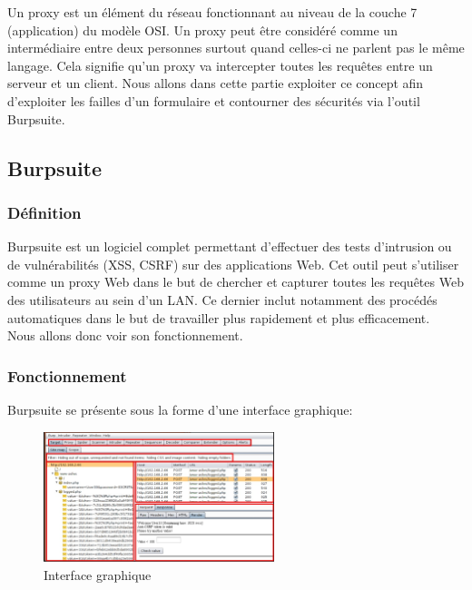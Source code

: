 Un proxy est un élément du réseau fonctionnant au niveau de la couche 7 (application) du modèle OSI. Un proxy peut être considéré comme un intermédiaire entre deux personnes surtout quand celles-ci ne parlent pas le même langage. Cela signifie qu'un proxy va intercepter toutes les requêtes entre un serveur et un client. Nous allons dans cette partie exploiter ce concept afin d'exploiter les failles d'un formulaire et contourner des sécurités via l'outil Burpsuite.

\subsection{Burpsuite}

\subsubsection{Définition}

Burpsuite est un logiciel complet permettant d’effectuer des tests d’intrusion ou de vulnérabilités (XSS, CSRF) sur des applications Web. Cet outil peut s’utiliser comme un proxy Web dans le but de chercher  et capturer toutes les requêtes Web des utilisateurs au sein d’un LAN. Ce dernier inclut notamment des procédés automatiques dans le but de travailler plus rapidement et plus efficacement.\\
Nous allons donc voir son fonctionnement.

\subsubsection{Fonctionnement}

Burpsuite se présente sous la forme d’une interface graphique:

\begin{figure}[htp!]
  \centering
  \setlength\figureheight{7cm}
  \setlength\figurewidth{9cm}
  \includegraphics[width=0.6\textwidth]{oui/Ancien/imangeancien/burpsuite/burpsuite1.PNG}
  \caption{Interface graphique}
  \label{fig:courbe-tikz}
\end{figure}

